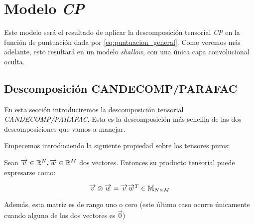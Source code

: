 \section{Modelo \textit{CP}}

Este modelo será el resultado de aplicar la descomposición tensorial \textit{CP} en la función de puntuación dada por \eqref{eq:puntuacion_general}. Como veremos más adelante, esto resultará en un modelo \textit{shallow}, con una única capa convolucional oculta.

\subsection{Descomposición CANDECOMP/PARAFAC}

En esta sección introduciremos la descomposición tensorial \textit{CANDECOMP/PARAFAC}. Esta es la descomposición más sencilla de las dos descomposiciones que vamos a manejar.

Empecemos introduciendo la siguiente propiedad sobre los tensores puros:

\begin{proposicion}
    Sean $\overrightarrow{v} \in \mathbb{R}^{N}, \overrightarrow{w} \in \mathbb{R}^{M}$ dos vectores. Entonces su producto tensorial puede expresarse como:

    $$\overrightarrow{v} \otimes \overrightarrow{w} = \overrightarrow{v} \overrightarrow{w}^T \in \mathbb{M}_{N \times M}$$

    Además, esta matriz es de rango uno o cero (este último caso ocurre únicamente cuando alguno de los dos vectores es $\vec{0}$)
\end{proposicion}

